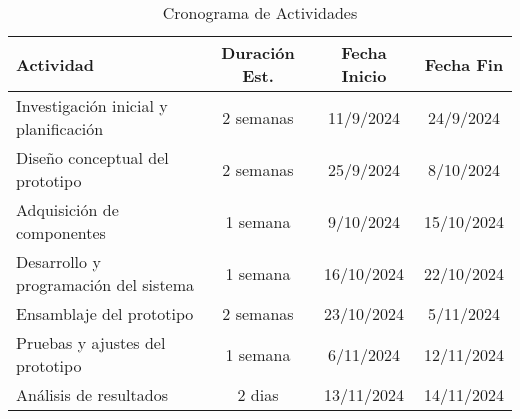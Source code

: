 \begin{table}[H]
    \centering
    \begin{tabular}{|l|c|c|c|}
        \hline
        \textbf{Actividad} & \textbf{Duración Est.} & \textbf{Fecha Inicio} & \textbf{Fecha Fin} \\
        \hline
        Investigación inicial y planificación & 2 semanas & 11/9/2024 & 24/9/2024 \\
        \hline
        Diseño conceptual del prototipo & 2 semanas & 25/9/2024 & 8/10/2024 \\
        \hline
        Adquisición de componentes & 1 semana & 9/10/2024 & 15/10/2024 \\
        \hline
        Desarrollo y programación del sistema & 1 semana & 16/10/2024 & 22/10/2024 \\ %
        \hline
        Ensamblaje del prototipo & 2 semanas & 23/10/2024 & 5/11/2024 \\ %
        \hline
        Pruebas y ajustes del prototipo & 1 semana & 6/11/2024 & 12/11/2024 \\ %
        \hline
        Análisis de resultados & 2 dias & 13/11/2024 & 14/11/2024 \\ %
        \hline
    \end{tabular}
    \caption{Cronograma de Actividades}
    \label{tab:cronograma_actividades}
\end{table}


